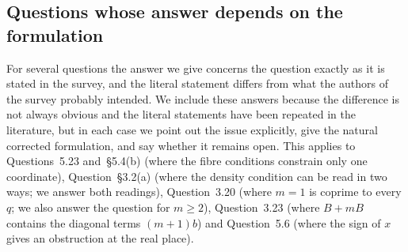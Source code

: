 \subsection*{Questions whose answer depends on the formulation}
For several questions the answer we give concerns the question exactly as it is stated in the survey,
and the literal statement differs from what the authors of the survey probably intended. We include
these answers because the difference is not always obvious and the literal statements have been
repeated in the literature, but in each case we point out the issue explicitly, give the natural
corrected formulation, and say whether it remains open. This applies to
Questions~5.23 and~\S5.4(b) (where the fibre conditions constrain only one coordinate),
Question~\S3.2(a) (where the density condition can be read in two ways; we answer both readings),
Question~3.20 (where $m=1$ is coprime to every $q$; we also answer the question for $m\ge2$),
Question~3.23 (where $B+mB$ contains the diagonal terms $(m+1)b$) and Question~5.6 (where the
sign of $x$ gives an obstruction at the real place).

